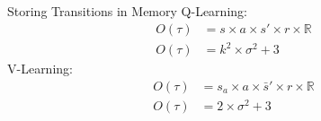 \documentclass[aspectratio=169, 11pt, invertlogo]{ismll-slides}
\begin{document}

\begin{frame}[fragile]{Storing Transitions in Memory}
	Q-Learning:
	\begin{align*}
		O(\tau) &= s \times a \times s' \times r \times \mathbb{R} \\
		O(\tau) &= k^2 \times \sigma^2 + 3
	\end{align*}
	V-Learning:
	\begin{align*}
		O(\tau) &= s_a \times a \times \bar s' \times r \times \mathbb{R} \\
		O(\tau) &= 2 \times \sigma^2 + 3
	\end{align*}
\end{frame}



\appendix


%
%




\begin{frame}[allowframebreaks]%
%
%
\end{frame}

\end{document}
